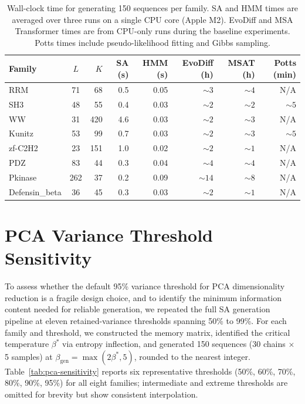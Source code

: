 \begin{table}[ht]
\centering
\small
\caption{Wall-clock time for generating 150 sequences per family. SA and HMM times are averaged over three runs on a single CPU core (Apple M2). EvoDiff and MSA Transformer times are from CPU-only runs during the baseline experiments. Potts times include pseudo-likelihood fitting and Gibbs sampling.}
\label{tab:timing}
\begin{tabular}{@{}lcrrrrrr@{}}
\toprule
Family & $L$ & $K$ & SA (s) & HMM (s) & EvoDiff (h) & MSAT (h) & Potts (min) \\
\midrule
RRM            & 71  & 68  & 0.5  & 0.05 & ${\sim}3$   & ${\sim}4$   & N/A \\
SH3            & 48  & 55  & 0.4  & 0.03 & ${\sim}2$   & ${\sim}2$   & ${\sim}5$ \\
WW             & 31  & 420 & 4.6  & 0.03 & ${\sim}2$   & ${\sim}3$   & N/A \\
Kunitz         & 53  & 99  & 0.7  & 0.03 & ${\sim}2$   & ${\sim}3$   & ${\sim}5$ \\
zf-C2H2        & 23  & 151 & 1.0  & 0.02 & ${\sim}2$   & ${\sim}1$   & N/A \\
PDZ            & 83  & 44  & 0.3  & 0.04 & ${\sim}4$   & ${\sim}4$   & N/A \\
Pkinase        & 262 & 37  & 0.2  & 0.09 & ${\sim}14$  & ${\sim}8$   & N/A \\
Defensin\_beta & 36  & 45  & 0.3  & 0.03 & ${\sim}2$   & ${\sim}1$   & N/A \\
\bottomrule
\end{tabular}
\end{table}

\section{PCA Variance Threshold Sensitivity}\label{si:pca-sensitivity}

To assess whether the default 95\% variance threshold for PCA dimensionality reduction is a fragile design choice, and to identify the minimum information content needed for reliable generation, we repeated the full SA generation pipeline at eleven retained-variance thresholds spanning 50\% to 99\%. For each family and threshold, we constructed the memory matrix, identified the critical temperature $\beta^*$ via entropy inflection, and generated 150 sequences (30 chains $\times$ 5 samples) at $\beta_{\mathrm{gen}} = \max(2\beta^*, 5)$, rounded to the nearest integer. Table~\ref{tab:pca-sensitivity} reports six representative thresholds (50\%, 60\%, 70\%, 80\%, 90\%, 95\%) for all eight families; intermediate and extreme thresholds are omitted for brevity but show consistent interpolation.

